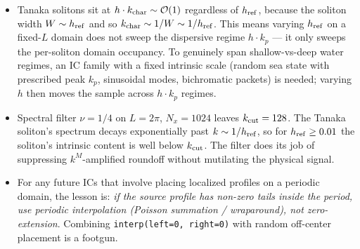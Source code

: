 \documentclass[11pt]{article}
\begin{document}
\begin{itemize}
  \item Tanaka solitons sit at $h \cdot k_{\rm char} \sim \mathcal{O}(1)$ regardless
        of $h_{\rm ref}$, because the soliton width $W \sim h_{\rm ref}$ and so
        $k_{\rm char} \sim 1/W \sim 1/h_{\rm ref}$. This means varying
        $h_{\rm ref}$ on a fixed-$L$ domain does not sweep the dispersive
        regime $h \cdot k_p$ --- it only sweeps the per-soliton domain
        occupancy. To genuinely span shallow-vs-deep water regimes, an IC
        family with a fixed intrinsic scale (random sea state with prescribed
        peak $k_p$, sinusoidal modes, bichromatic packets) is needed; varying
        $h$ then moves the sample across $h \cdot k_p$ regimes.
  \item Spectral filter $\nu = 1/4$ on $L = 2\pi$, $N_x = 1024$ leaves
        $k_{\rm cut} = 128$. The Tanaka soliton's spectrum decays exponentially
        past $k \sim 1/h_{\rm ref}$, so for $h_{\rm ref} \geq 0.01$ the soliton's
        intrinsic content is well below $k_{\rm cut}$. The filter does its job
        of suppressing $k^M$-amplified roundoff without mutilating the
        physical signal.
  \item For any future ICs that involve placing localized profiles on a
        periodic domain, the lesson is: \emph{if the source profile has
        non-zero tails inside the period, use periodic interpolation
        (Poisson summation / wraparound), not zero-extension}. Combining
        \texttt{interp(left=0, right=0)} with random off-center placement
        is a footgun.
\end{itemize}
\end{document}
